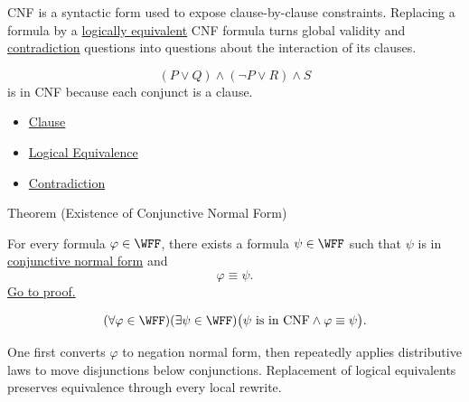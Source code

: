 \begin{remark*}[Interpretation]
CNF is a syntactic form used to expose clause-by-clause constraints. Replacing
a formula by a
\hyperref[def:logical-equivalence-propositional-logic]{logically equivalent}
CNF formula turns global validity and
\hyperref[def:contradiction-propositional-logic]{contradiction} questions into
questions about the interaction of its clauses.
\end{remark*}

\begin{example*}[Examples]
\[
(P\lor Q)\land(\neg P\lor R)\land S
\]
is in CNF because each conjunct is a clause.
\end{example*}

\begin{dependencies}
\begin{itemize}
  \item \hyperref[def:clause-propositional-logic]{Clause}
  \item \hyperref[def:logical-equivalence-propositional-logic]{Logical Equivalence}
  \item \hyperref[def:contradiction-propositional-logic]{Contradiction}
\end{itemize}
\end{dependencies}

\begin{theorembox}{Theorem (Existence of Conjunctive Normal Form)}
\begin{theorem}
\label{thm:existence-conjunctive-normal-form-propositional-logic}
For every formula \(\varphi\in\WFF\), there exists a formula
\(\psi\in\WFF\) such that \(\psi\) is in
\hyperref[def:conjunctive-normal-form-propositional-logic]{conjunctive normal form}
and
\[
\varphi\equiv\psi.
\]
\noindent\hyperref[prf:existence-conjunctive-normal-form-propositional-logic]{Go to proof.}
\end{theorem}
\end{theorembox}
\begin{remark*}
\[
(\forall\varphi\in\WFF)(\exists\psi\in\WFF)
\bigl(\psi\text{ is in CNF}\land \varphi\equiv\psi\bigr).
\]
\end{remark*}




\begin{remark*}[Interpretation]
One first converts \(\varphi\) to negation normal form, then repeatedly applies
distributive laws to move disjunctions below conjunctions. Replacement of
logical equivalents preserves equivalence through every local rewrite.
\end{remark*}

